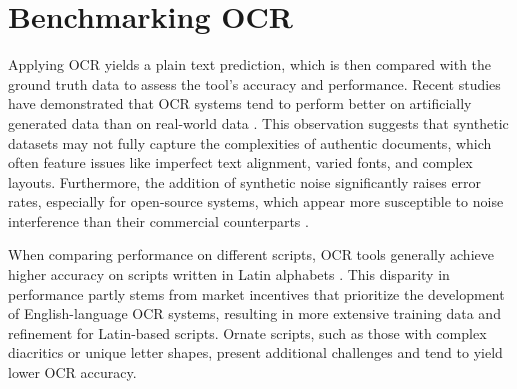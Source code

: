 \documentclass[12pt,oneside]{memoir}
\begin{document}

\section{Benchmarking OCR}
Applying OCR yields a plain text prediction, which is then compared with the ground truth data to assess the tool’s accuracy and performance.
Recent studies have demonstrated that OCR systems tend to perform better on artificially generated data than on real-world data \parencite{ignat-etal-2022}.
This observation suggests that synthetic datasets may not fully capture the complexities of authentic documents, which often feature issues like imperfect text alignment, varied fonts, and complex layouts.
Furthermore, the addition of synthetic noise significantly raises error rates, especially for open-source systems, which appear more susceptible to noise interference than their commercial counterparts \parencite{hegghammer-2022}.

When comparing performance on different scripts, OCR tools generally achieve higher accuracy on scripts written in Latin alphabets \parencite{hegghammer-2022, ignat-etal-2022}.
This disparity in performance partly stems from market incentives that prioritize the development of English-language OCR systems, resulting in more extensive training data and refinement for Latin-based scripts. 
Ornate scripts, such as those with complex diacritics or unique letter shapes, present additional challenges and tend to yield lower OCR accuracy.
\end{document}
